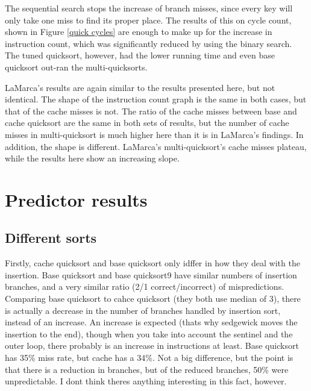 The sequential search stops the increase of branch misses, since every key will
only take one miss to find its proper place. The results of this on cycle
count, shown in Figure \ref{quick cycles} are enough to make up for the increase
in instruction count, which was significantly reduced by using the binary
search.  The tuned quicksort, however, had the lower running time and even base
quicksort out-ran the multi-quicksorts.

LaMarca's results are again similar to the results presented here, but not
identical. The shape of the instruction count graph is the same in both cases,
but that of the cache misses is not. The ratio of the cache misses between base
and cache quicksort are the same in both sets of results, but the number of
cache misses in multi-quicksort is much higher here than it is in LaMarca's
findings. In addition, the shape is different. LaMarca's multi-quicksort's
cache misses plateau, while the results here show an increasing slope.
\section{Predictor results}

\subsection{Different sorts}


Firstly, cache quicksort and base quicksort only idffer in how they deal with
the insertion. Base quicksort and base quicksort9 have similar numbers of
insertion branches, and a very similar ratio (2/1 correct/incorrect) of
mispredictions. Comparing base quicksort to cahce quicksort (they both use
median of 3), there is actually a decrease in the number of branches handled by
insertion sort, instead of an increase. An increase is expected (thats why
sedgewick moves the insertion to the end), though when you take into account
the sentinel and the outer loop, there probably is an increase in instructions
at least. Base quicksort has 35\% miss rate, but cache has a 34\%. Not a big
difference, but the point is that there is a reduction in branches, but of the
reduced branches, 50\% were unpredictable. I dont think theres anything
interesting in this fact, however.

